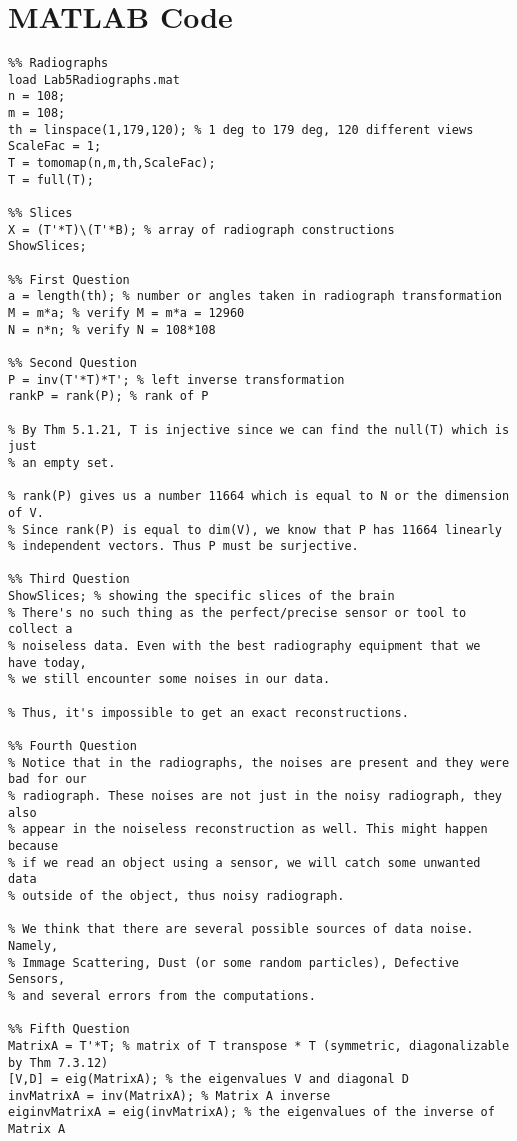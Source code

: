 \documentclass{article}
\begin{document}
\section{MATLAB Code}
\begin{verbatim}
%% Radiographs
load Lab5Radiographs.mat
n = 108;
m = 108;
th = linspace(1,179,120); % 1 deg to 179 deg, 120 different views
ScaleFac = 1;
T = tomomap(n,m,th,ScaleFac);
T = full(T);

%% Slices
X = (T'*T)\(T'*B); % array of radiograph constructions
ShowSlices; 

%% First Question
a = length(th); % number or angles taken in radiograph transformation
M = m*a; % verify M = m*a = 12960
N = n*n; % verify N = 108*108

%% Second Question
P = inv(T'*T)*T'; % left inverse transformation
rankP = rank(P); % rank of P

% By Thm 5.1.21, T is injective since we can find the null(T) which is just
% an empty set.

% rank(P) gives us a number 11664 which is equal to N or the dimension of V.
% Since rank(P) is equal to dim(V), we know that P has 11664 linearly
% independent vectors. Thus P must be surjective.

%% Third Question
ShowSlices; % showing the specific slices of the brain
% There's no such thing as the perfect/precise sensor or tool to collect a
% noiseless data. Even with the best radiography equipment that we have today, 
% we still encounter some noises in our data. 

% Thus, it's impossible to get an exact reconstructions.

%% Fourth Question
% Notice that in the radiographs, the noises are present and they were bad for our
% radiograph. These noises are not just in the noisy radiograph, they also
% appear in the noiseless reconstruction as well. This might happen because
% if we read an object using a sensor, we will catch some unwanted data
% outside of the object, thus noisy radiograph.

% We think that there are several possible sources of data noise. Namely,
% Immage Scattering, Dust (or some random particles), Defective Sensors,
% and several errors from the computations.

%% Fifth Question
MatrixA = T'*T; % matrix of T transpose * T (symmetric, diagonalizable by Thm 7.3.12)
[V,D] = eig(MatrixA); % the eigenvalues V and diagonal D
invMatrixA = inv(MatrixA); % Matrix A inverse
eiginvMatrixA = eig(invMatrixA); % the eigenvalues of the inverse of Matrix A


\end{verbatim}
\end{document}
